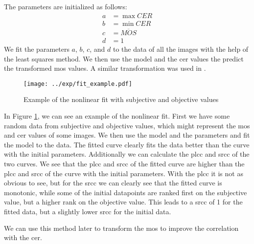 The parameters are initialized as follows:
\begin{equation}
    \begin{aligned}
        a &= \max{CER} \\
        b &= \min{CER} \\
        c &= \overline{MOS} \\
        d &= 1
    \end{aligned}
    \label{eq:nonlinear_init}
\end{equation}
We fit the parameters \(a\), \(b\), \(c\), and \(d\) to the data of all the images with the help of the least squares method.
We then use the model and the \gls{cer} values the predict the transformed \gls{mos} values.
A similar transformation was used in \cite{nonlin_fit_2011}\cite{nonlin_fit_appl_2017}.

\begin{figure}[h]
    \centering
    \texttt{[image: ../exp/fit\_example.pdf]}
    \caption{Example of the nonlinear fit with subjective and objective values}
    \label{fig:nonlinear_fit}
\end{figure}

In Figure \ref{fig:nonlinear_fit}, we can see an example of the nonlinear fit.
First we have some random data from subjective and objective values, which might represent the \gls{mos} and \gls{cer} values of some images.
We then use the model and the parameters and fit the model to the data.
The fitted curve clearly fits the data better than the curve with the initial parameters.
Additionally we can calculate the \gls{plcc} and \gls{srcc} of the two curves.
We see that the \gls{plcc} and \gls{srcc} of the fitted curve are higher than the \gls{plcc} and \gls{srcc} of the curve with the initial parameters.
With the \gls{plcc} it is not as obvious to see, but for the \gls{srcc} we can clearly see that the fitted curve is monotonic, while some of the initial datapoints are ranked first on the subjective value, but a higher rank on the objective value.
This leads to a \gls{srcc} of 1 for the fitted data, but a slightly lower \gls{srcc} for the initial data.

We can use this method later to transform the \gls{mos} to improve the correlation with the \gls{cer}.
